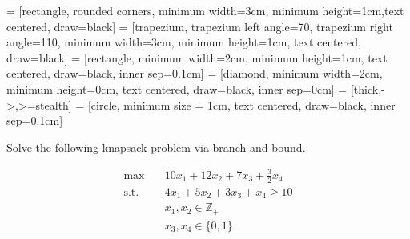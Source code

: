 
\usepackage{makecell}
\usepackage{forest}
\setlength{\parindent}{0pt}

\usetikzlibrary{shapes.geometric, arrows}
     = [rectangle, rounded corners, minimum width=3cm, minimum height=1cm,text centered, draw=black]
     = [trapezium, trapezium left angle=70, trapezium right angle=110, minimum width=3cm, minimum height=1cm, text centered, draw=black]
     = [rectangle, minimum width=2cm, minimum height=1cm, text centered, draw=black, inner sep=0.1cm]
     = [diamond, minimum width=2cm, minimum height=0cm, text centered, draw=black, inner sep=0cm]
     = [thick,->,>=stealth]
     = [circle, minimum size = 1cm, text centered, draw=black, inner sep=0.1cm]

\renewcommand{\docTitle}{Example - Branch and Bound}
\renewcommand{\docAuthor}{Lan Peng, Ph.D.}
\renewcommand{\docAffil}{School of Management, Shanghai University, Shanghai, China}

    \titleSec

    Solve the following knapsack problem via branch-and-bound.

    \begin{align*}
        \max \quad &10 x_1 + 12 x_2 + 7 x_3 + \frac{3}{2} x_4\\
        \text{s.t.} \quad & 4 x_1 + 5 x_2 + 3 x_3 + x_4 \ge 10\\
        & x_1, x_2 \in \mathbb{Z}_+\\
        & x_3, x_4 \in \{0, 1\}
    \end{align*}

